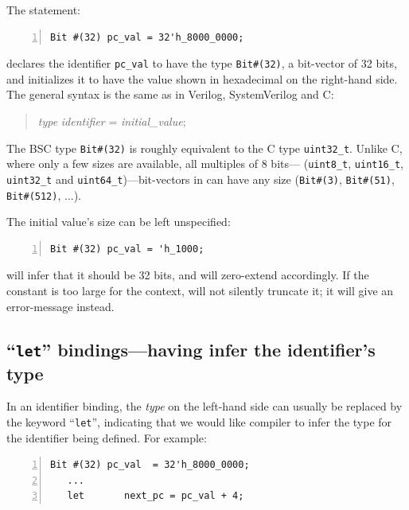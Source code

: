 The {\BSV} statement:

{\footnotesize
\begin{Verbatim}[frame=single, numbers=left]
   Bit #(32) pc_val = 32'h_8000_0000;
\end{Verbatim}
}

declares the identifier \verb|pc_val| to have the type
\verb|Bit#(32)|, {\ie} a bit-vector of 32 bits, and initializes it to
have the value shown in hexadecimal on the right-hand side.
The general syntax is the same as in Verilog, SystemVerilog and C:
\begin{quote}
\emph{type} \emph{identifier} = \emph{initial\_value};
\end{quote}

The BSC type \verb|Bit#(32)| is roughly equivalent to the C type
\verb|uint32_t|.  Unlike C, where only a few sizes are available, all
multiples of 8 bits--- (\verb|uint8_t|, \verb|uint16_t|,
\verb|uint32_t| and \verb|uint64_t|)---bit-vectors in {\BSV} can have any
size (\verb|Bit#(3)|, \verb|Bit#(51)|, \verb|Bit#(512)|, ...).

The initial value's size can be left unspecified:

{\footnotesize
\begin{Verbatim}[frame=single, numbers=left]
   Bit #(32) pc_val = 'h_1000;
\end{Verbatim}
}

{\bsc} will infer that it should be 32 bits, and will zero-extend
accordingly.  If the constant is too large for the context, {\bsc}
will not silently truncate it; it will give an error-message instead.


\subsection{``{\tt let}'' bindings---having {\bsc} infer the identifier's type}

\label{Sec_let_binding}


In an identifier binding, the \emph{type} on the left-hand side can
usually be replaced by the keyword ``{\tt let}'', indicating that we
would like {\bsc} compiler to infer the type for the identifier being
defined.  For example:

{\footnotesize
\begin{Verbatim}[frame=single, numbers=left]
   Bit #(32) pc_val  = 32'h_8000_0000;
   ...
   let       next_pc = pc_val + 4;
\end{Verbatim}
}

